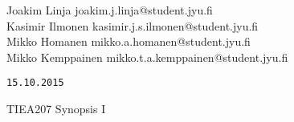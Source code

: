 \documentclass[a4paper, twoside, english, 12pt]{article}
\title{}
\author{Joakim Linja}
\begin{document}
\setlength{\parindent}{0pt} %
\setlength{\parskip}{4mm} %
\onehalfspacing
\newcommand{\pound}{\operatornamewithlimits{\#}}
\newcommand{\lA}{\left\langle}
\newcommand{\rA}{\right\rangle}
\newcommand{\lI}{\left|}
\newcommand{\rI}{\right|}
\newcommand{\Unit}[1]{\ \unit{#1}}
\newcommand{\Var}[2]{$#1\ \unit{#2}$}
\newcommand{\Varf}[3]{$#1\ \frac{\unit{#2}}{\unit{#3}}$}
\newcommand{\Eqen}{\text{.}}
\newcommand{\todoi}[1]{\todo[inline]{#1}}
\newcommand{\cluster}[2]{$\text{#1}_{#2}$}
\newcommand{\vuosi}{2014}
\newcommand{\question}[1]{\subsection*{Question {#1} solution}}
\newcommand{\labwork}[1]{\newpage \section{#1}}
\newcommand{\E}[1]{\cdot 10^{#1}}
\newcommand{\Et}[1]{\ \text{x}10^{#1}}
\newcommand{\EUnit}[2]{\E{#1}\Unit{#2}}
\newcommand{\FUnit}[2]{\ \frac{\unit{#1}}{\unit{#2}}}
\newcommand{\EFUnit}[3]{\E{#1}\frac{\unit{#2}}{\unit{#3}}}
\newcommand{\upd}{\text{d}}

\renewcommand\thesection{\Alph{section}}
\renewcommand\thesubsection{\thesection.\arabic{subsection}}

\begin{flushleft}
Joakim Linja
\hfill 
\textsf{joakim.j.linja@student.jyu.fi}\hfill
\\ Kasimir Ilmonen\hfill
\textsf{kasimir.j.s.ilmonen@student.jyu.fi}\hfill
\\ Mikko Homanen\hfill
\textsf{mikko.a.homanen@student.jyu.fi}\hfill
\\ Mikko Kemppainen\hfill
\textsf{mikko.t.a.kemppainen@student.jyu.fi}\hfill

\hfill \texttt{15.10.2015}
\end{flushleft}
\setcounter{page}{1}

\begin{center}
\huge
{TIEA207 Synopsis I}
\end{center}



%
\end{document}
